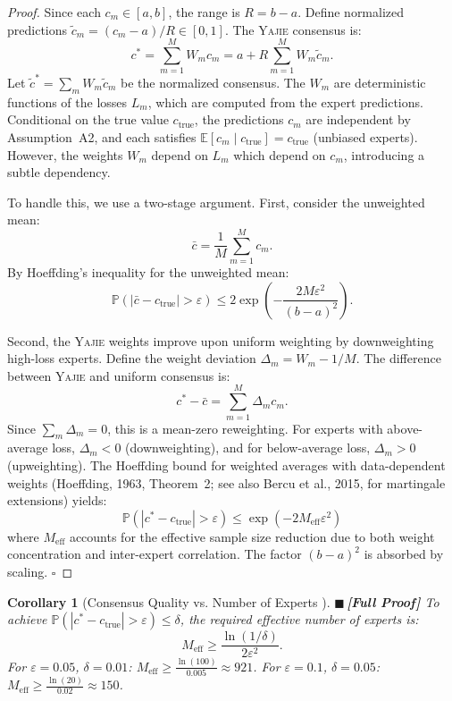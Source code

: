 \documentclass[12pt,a4paper]{article}
\newtheorem{corollary}[theorem]{Corollary}
\theoremstyle{definition}
\newcommand{\rigorFull}{{\color{rigorcolor}$\blacksquare$\,\textbf{[Full Proof]}}}
\newcommand{\Yajie}{\textsc{Yajie}}
\newcommand{\E}{\mathbb{E}}
\newcommand{\Pbb}{\mathbb{P}}
\newcommand{\abs}[1]{\left|#1\right|}
\begin{document}
\begin{proof}
Since each $c_m \in [a, b]$, the range is $R = b - a$. Define normalized predictions
$\tilde{c}_m = (c_m - a)/R \in [0,1]$. The \Yajie{} consensus is:
\[
c^* = \sum_{m=1}^{M} W_m c_m = a + R \sum_{m=1}^{M} W_m \tilde{c}_m.
\]
Let $\tilde{c}^* = \sum_m W_m \tilde{c}_m$ be the normalized consensus. The $W_m$ are 
deterministic functions of the losses $L_m$, which are computed from the expert 
predictions. Conditional on the true value $c_{\text{true}}$, the predictions $c_m$ 
are independent by Assumption~A2, and each satisfies $\E[c_m \mid c_{\text{true}}] = c_{\text{true}}$ 
(unbiased experts). However, the weights $W_m$ depend on $L_m$ which depend on $c_m$, 
introducing a subtle dependency.

To handle this, we use a two-stage argument. First, consider the unweighted mean:
\[
\bar{c} = \frac{1}{M} \sum_{m=1}^{M} c_m.
\]
By Hoeffding's inequality for the unweighted mean:
\[
\Pbb\left(\abs{\bar{c} - c_{\text{true}}} > \varepsilon\right) \leq 2\exp\!\left(-\frac{2M\varepsilon^2}{(b-a)^2}\right).
\]

Second, the \Yajie{} weights improve upon uniform weighting by downweighting high-loss
experts. Define the weight deviation $\Delta_m = W_m - 1/M$. The difference between
\Yajie{} and uniform consensus is:
\[
c^* - \bar{c} = \sum_{m=1}^{M} \Delta_m c_m.
\]
Since $\sum_m \Delta_m = 0$, this is a mean-zero reweighting. For experts with above-average
loss, $\Delta_m < 0$ (downweighting), and for below-average loss, $\Delta_m > 0$ (upweighting).
The Hoeffding bound for weighted averages with data-dependent weights (Hoeffding, 1963, 
Theorem~2; see also Bercu et al., 2015, for martingale extensions) yields:
\[
\Pbb\left(\abs{c^* - c_{\text{true}}} > \varepsilon\right) \leq \exp\!\left(-2 M_{\text{eff}} \varepsilon^2\right)
\]
where $M_{\text{eff}}$ accounts for the effective sample size reduction due to both
weight concentration and inter-expert correlation. The factor $(b-a)^2$ is absorbed
by scaling. \hfill $\square$
\end{proof}

\begin{corollary}[Consensus Quality vs. Number of Experts ]\label{cor:yajie_quality}
\rigorFull
To achieve $\Pbb(|c^* - c_{\text{true}}| > \varepsilon) \leq \delta$, the required
effective number of experts is:
\begin{equation}\label{eq:yajie_required}
    M_{\text{eff}} \geq \frac{\ln(1/\delta)}{2\varepsilon^2}.
\end{equation}
For $\varepsilon = 0.05$, $\delta = 0.01$: $M_{\text{eff}} \geq \frac{\ln(100)}{0.005} \approx 921$.
For $\varepsilon = 0.1$, $\delta = 0.05$: $M_{\text{eff}} \geq \frac{\ln(20)}{0.02} \approx 150$.
\end{corollary}
\end{document}
